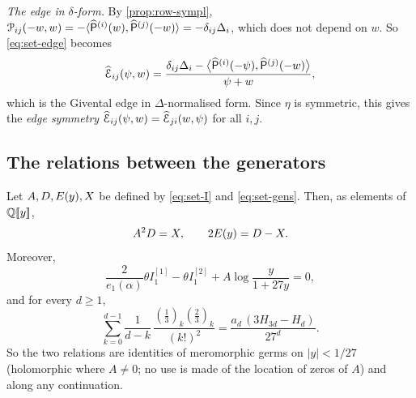 \emph{The edge in $\delta$-form.} By \cref{prop:row-sympl}, $\mathcal{P}_{ij}(-w,w)=-\langle\widehat{\mathsf{P}}^{(i)}(w),\widehat{\mathsf{P}}^{(j)}(-w)\rangle=-\delta_{ij}\Delta_i$, which does not depend on $w$. So \eqref{eq:set-edge} becomes
\begin{equation}
\label{eq:row-edgedelta}
\widehat{\mathcal{E}}_{ij}(\psi,w)=\frac{\delta_{ij}\Delta_i-\big\langle\widehat{\mathsf{P}}^{(i)}(-\psi),\widehat{\mathsf{P}}^{(j)}(-w)\big\rangle}{\psi+w},
\end{equation}
which is the Givental edge in $\Delta$-normalised form. Since $\eta$ is symmetric, this gives the \emph{edge symmetry} $\widehat{\mathcal{E}}_{ij}(\psi,w)=\widehat{\mathcal{E}}_{ji}(w,\psi)$ for all $i,j$.

\subsection{The relations between the generators}
\label{sec:row-modrel}

\begin{prop}
\label{prop:row-modrel}
Let $A,D,E(y),X$ be defined by \eqref{eq:set-I} and \eqref{eq:set-gens}. Then, as elements of $\mathbb{Q}[\![ y ]\!]$,
\[
A^2D=X,\qquad2E(y)=D-X.
\]
Moreover,
\begin{equation}
\label{eq:row-DEX}
\frac{2}{e_1(\alpha)}\theta I_1^{[1]}-\theta I_1^{[2]}+A\log\frac{y}{1+27y}=0,
\end{equation}
and for every $d\geq1$,
\begin{equation}
\label{eq:row-conv}
\sum_{k=0}^{d-1}\frac{1}{d-k}\,\frac{(\frac13)_k(\frac23)_k}{(k!)^2}=\frac{a_d\,(3H_{3d}-H_d)}{27^d}.
\end{equation}
So the two relations are identities of meromorphic germs on $|y|<1/27$ (holomorphic where $A\neq0$; no use is made of the location of zeros of $A$) and along any continuation.
\end{prop}

